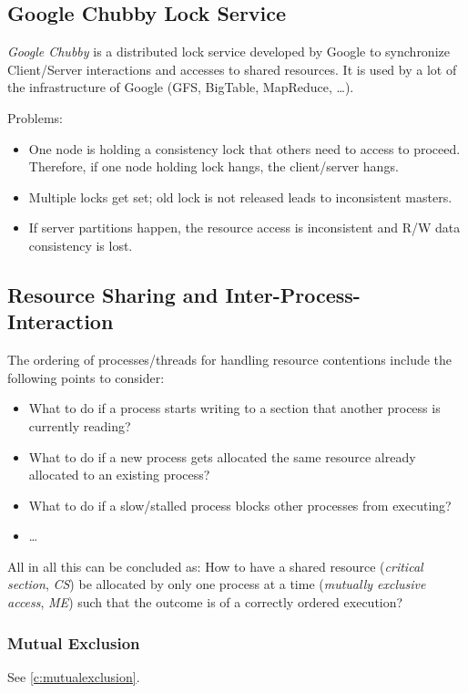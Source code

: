		\subsection{Google Chubby Lock Service}
			\textit{Google Chubby} is a distributed lock service developed by Google to synchronize Client/Server interactions and accesses to shared resources. It is used by a lot of the infrastructure of Google (GFS, BigTable, MapReduce, \dots).

			Problems:
			\begin{itemize}
				\item One node is holding a consistency lock that others need to access to proceed. Therefore, if one node holding lock hangs, the client/server hangs.
				\item Multiple locks get set; old lock is not released leads to inconsistent masters.
				\item If server partitions happen, the resource access is inconsistent and R/W data consistency is lost.
			\end{itemize}

		\subsection{Resource Sharing and Inter-Process-Interaction}
			The ordering of processes/threads for handling resource contentions include the following points to consider:
			\begin{itemize}
				\item What to do if a process starts writing to a section that another process is currently reading?
				\item What to do if a new process gets allocated the same resource already allocated to an existing process?
				\item What to do if a slow/stalled process blocks other processes from executing?
				\item \dots
			\end{itemize}
			All in all this can be concluded as: How to have a shared resource (\textit{critical section}, \textit{CS}) be allocated by only one process at a time (\textit{mutually exclusive access}, \textit{ME}) such that the outcome is of a correctly ordered execution?

			\subsubsection{Mutual Exclusion}
				See \ref{c:mutualexclusion}.

